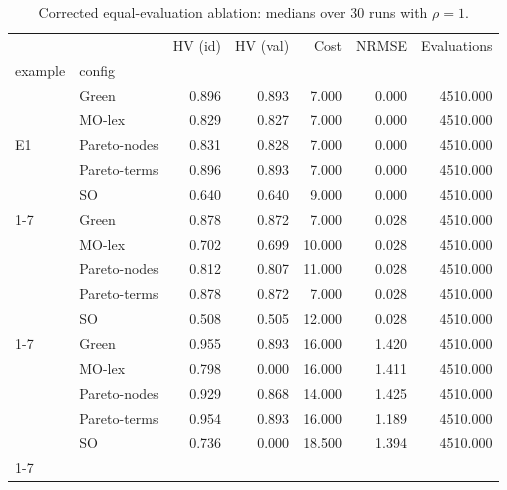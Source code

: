 \begin{table}[!htbp]\centering
\caption{Corrected equal-evaluation ablation: medians over 30 runs with $\rho=1$.}
\begin{tabular}{llrrrrr}
\toprule
 &  & HV (id) & HV (val) & Cost & NRMSE & Evaluations \\
example & config &  &  &  &  &  \\
\midrule
\multirow[t]{5}{*}{E1} & Green & 0.896 & 0.893 & 7.000 & 0.000 & 4510.000 \\
 & MO-lex & 0.829 & 0.827 & 7.000 & 0.000 & 4510.000 \\
 & Pareto-nodes & 0.831 & 0.828 & 7.000 & 0.000 & 4510.000 \\
 & Pareto-terms & 0.896 & 0.893 & 7.000 & 0.000 & 4510.000 \\
 & SO & 0.640 & 0.640 & 9.000 & 0.000 & 4510.000 \\
\cline{1-7}
\multirow[t]{5}{*}{E2} & Green & 0.878 & 0.872 & 7.000 & 0.028 & 4510.000 \\
 & MO-lex & 0.702 & 0.699 & 10.000 & 0.028 & 4510.000 \\
 & Pareto-nodes & 0.812 & 0.807 & 11.000 & 0.028 & 4510.000 \\
 & Pareto-terms & 0.878 & 0.872 & 7.000 & 0.028 & 4510.000 \\
 & SO & 0.508 & 0.505 & 12.000 & 0.028 & 4510.000 \\
\cline{1-7}
\multirow[t]{5}{*}{E3} & Green & 0.955 & 0.893 & 16.000 & 1.420 & 4510.000 \\
 & MO-lex & 0.798 & 0.000 & 16.000 & 1.411 & 4510.000 \\
 & Pareto-nodes & 0.929 & 0.868 & 14.000 & 1.425 & 4510.000 \\
 & Pareto-terms & 0.954 & 0.893 & 16.000 & 1.189 & 4510.000 \\
 & SO & 0.736 & 0.000 & 18.500 & 1.394 & 4510.000 \\
\cline{1-7}
\bottomrule
\end{tabular}
\end{table}
